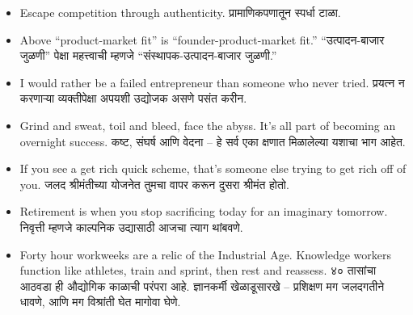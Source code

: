 \begin{frame}[fragile]
\begin{itemize}
  \item Escape competition through authenticity. प्रामाणिकपणातून स्पर्धा टाळा.

  \item Above ``product-market fit'' is ``founder-product-market fit.'' ``उत्पादन-बाजार जुळणी'' पेक्षा महत्त्वाची म्हणजे ``संस्थापक-उत्पादन-बाजार जुळणी.''

  \item I would rather be a failed entrepreneur than someone who never tried. प्रयत्न न करणाऱ्या व्यक्तीपेक्षा अपयशी उद्योजक असणे पसंत करीन.

  \item Grind and sweat, toil and bleed, face the abyss. It’s all part of becoming an overnight success. कष्ट, संघर्ष आणि वेदना – हे सर्व एका क्षणात मिळालेल्या यशाचा भाग आहेत.

  \item If you see a get rich quick scheme, that’s someone else trying to get rich off of you. जलद श्रीमंतीच्या योजनेत तुमचा वापर करून दुसरा श्रीमंत होतो.

  \item Retirement is when you stop sacrificing today for an imaginary tomorrow. निवृत्ती म्हणजे काल्पनिक उद्यासाठी आजचा त्याग थांबवणे.

  \item Forty hour workweeks are a relic of the Industrial Age. Knowledge workers function like athletes, train and sprint, then rest and reassess. ४० तासांचा आठवडा ही औद्योगिक काळाची परंपरा आहे. ज्ञानकर्मी खेळाडूसारखे – प्रशिक्षण मग जलदगतीने धावणे, आणि मग विश्रांती घेत मागोवा घेणे. 
\end{itemize}

\end{frame}


